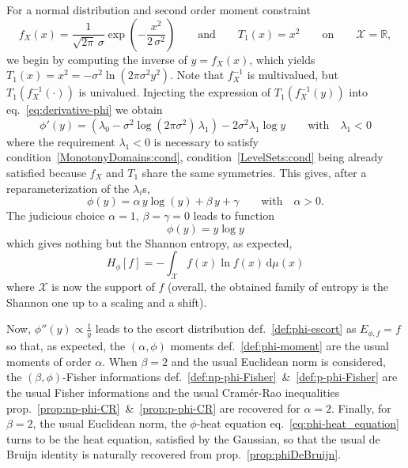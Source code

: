 \documentclass[entropy,article,submit,moreauthors,pdftex]{Definitions/mdpi}
\def\dmu{\mathrm{d}\mu}%
\def\Rset{\mathbb{R}}%
\def\X{\mathcal{X}}%
\begin{document}
For a normal distribution and second order moment constraint 
%
\[
f_X(x) =  \frac{1}{\sqrt{2\pi} \,\sigma}  \exp\left( -\frac{x^2}{2  \, \sigma^2}
\right)  \qquad \mbox{and}  \qquad T_1(x)  = x^2  \qquad \mbox{on}  \qquad \X  =
\Rset,
\]
%
we begin by computing the inverse of $y  = f_X(x)$, which yields $T_1(x) = x^2 =
- \sigma^2  \ln \left(2  \pi  \sigma^2  y^2 \right)$.  Note  that $f_X^{-1}$  is
multivalued, but $T_1\left( f_X^{-1}( \cdot  ) \right)$ is univalued.  Injecting
the     expression      of     $T_1\left(     f_X^{-1}(y)      \right)$     into
eq.~\eqref{eq:derivative-phi} we obtain
%
\[
\phi'(y) = \left( \lambda_0 - \sigma^2 \log(2 \pi \sigma^2) \, \lambda_1 \right)
- 2 \sigma^2 \lambda_1 \log y \qquad \mbox{with} \quad \lambda_1 < 0
\]
%
where    the   requirement    $\lambda_1   <0$    is   necessary    to   satisfy
condition~\ref{MonotonyDomains:cond},    condition~\ref{LevelSets:cond}    being
already satisfied because $f_X$ and $T_1$ share the same symmetries. This gives,
after a reparameterization of the $\lambda_i$s,
%
\[
\phi(y) =  \alpha \, y \log(y)  + \beta \,  y + \gamma \qquad  \mbox{with} \quad
\alpha > 0.
\]
%
The judicious choice $\alpha = 1, \, \beta = \gamma = 0$ leads to function
%
\[
\phi(y) = y \log y
\]
%
which gives nothing but the Shannon entropy, as expected,
%
\[
H_\phi[f] = - \int_\X f(x) \ln f(x) \, \dmu(x)
\]
%
where $\X$ is now the support of $f$ (overall, the obtained family of entropy is
the Shannon one up to a scaling and a shift).

Now,   $\phi''(y)   \propto   \frac1y$   leads  to   the   escort   distribution
def.~\ref{def:phi-escort}  as  $E_{\phi,f}  =  f$  so  that,  as  expected,  the
$(\alpha,\phi)$ moments def.~\ref{def:phi-moment} are the usual moments of order
$\alpha$.  When  $\beta =  2$ and  the usual Euclidean  norm is  considered, the
$(\beta,\phi)$-Fisher                                               informations
def.~\ref{def:np-phi-Fisher}~\&~\ref{def:p-phi-Fisher}  are   the  usual  Fisher
informations       and      the       usual      Cram\'er-Rao       inequalities
prop.~\ref{prop:np-phi-CR}~\&~\ref{prop:p-phi-CR}  are recovered  for $\alpha  =
2$.   Finally, for  $\beta  =  2$, the  usual  Euclidean  norm, the  $\phi$-heat
equation  eq.~\eqref{eq:phi-heat_equation}  turns  to   be  the  heat  equation,
satisfied by  the Gaussian, so  that the usual  de Bruijn identity  is naturally
recovered from prop.~\ref{prop:phiDeBruijn}.



\end{document}
